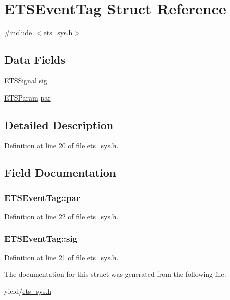 \hypertarget{structETSEventTag}{}\section{E\+T\+S\+Event\+Tag Struct Reference}
\label{structETSEventTag}


{\ttfamily \#include $<$ets\+\_\+sys.\+h$>$}

\subsection*{Data Fields}
\begin{DoxyCompactItemize}
\item 
\hyperlink{ets__sys_8h_a5ca6a2be825d5fb421c6e97e8d65d5ca}{E\+T\+S\+Signal} \hyperlink{structETSEventTag_ad1d6c1080c28369b619311d17902b744}{sig}
\item 
\hyperlink{ets__sys_8h_af69975ab315b652862825f9929e436c0}{E\+T\+S\+Param} \hyperlink{structETSEventTag_a6015492ea4e05e188d2a3e293aefeb31}{par}
\end{DoxyCompactItemize}


\subsection{Detailed Description}


Definition at line 20 of file ets\+\_\+sys.\+h.



\subsection{Field Documentation}
\subsubsection[{\texorpdfstring{par}{par}}]{ E\+T\+S\+Event\+Tag\+::par}\hypertarget{structETSEventTag_a6015492ea4e05e188d2a3e293aefeb31}{}\label{structETSEventTag_a6015492ea4e05e188d2a3e293aefeb31}


Definition at line 22 of file ets\+\_\+sys.\+h.

\subsubsection[{\texorpdfstring{sig}{sig}}]{ E\+T\+S\+Event\+Tag\+::sig}\hypertarget{structETSEventTag_ad1d6c1080c28369b619311d17902b744}{}\label{structETSEventTag_ad1d6c1080c28369b619311d17902b744}


Definition at line 21 of file ets\+\_\+sys.\+h.



The documentation for this struct was generated from the following file\+:\begin{DoxyCompactItemize}
\item 
yield/\hyperlink{ets__sys_8h}{ets\+\_\+sys.\+h}\end{DoxyCompactItemize}
